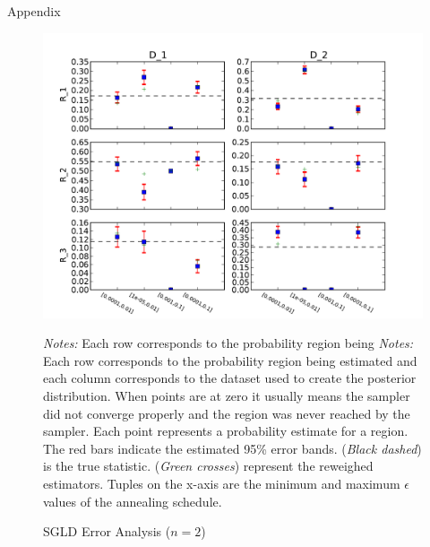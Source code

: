 \documentclass{article}
\begin{document}
\begin{section}{Appendix}

\begin{figure}[h!]
\caption{SGLD Error Analysis ($n=2$)}
\label{n2}
\begin{center}
\includegraphics[scale=0.7]{../figures/errors_n2.pdf}
\end{center}
{\scriptsize {\em Notes:} Each row corresponds to the probability region being {\em Notes:} Each row corresponds to the probability region being estimated and each column corresponds to the dataset used to create the posterior distribution. When points are at zero it usually means the sampler did not converge properly and the region was never reached by the sampler.  Each point represents a probability estimate for a region. The red bars indicate the estimated 95\% error bands.  ({\em Black dashed}) is the true statistic.  ({\em Green crosses}) represent the reweighed estimators. Tuples on the x-axis are the minimum and maximum $\epsilon$ values of the annealing schedule. }
\end{figure}


\end{section}
\end{document}

